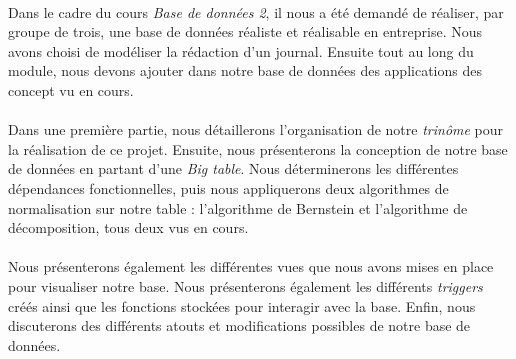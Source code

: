 \paragraph{}{
    Dans le cadre du cours \textit{Base de données 2}, il nous a été demandé de réaliser, par groupe de trois, une base de données réaliste et réalisable en entreprise. Nous avons choisi de modéliser la rédaction d'un journal. Ensuite tout au long du module, nous devons ajouter dans notre base de données des applications des concept vu en cours.
}

\paragraph{}{
    Dans une première partie, nous détaillerons l'organisation de notre \textit{trinôme} pour la réalisation de ce projet. Ensuite, nous présenterons la conception de notre base de données en partant d'une \textit{Big table}. Nous déterminerons les différentes dépendances fonctionnelles, puis nous appliquerons deux algorithmes de normalisation sur notre table : l'algorithme de Bernstein et l'algorithme de décomposition, tous deux vus en cours.
}

\paragraph{}{
    Nous présenterons également les différentes vues que nous avons mises en place pour visualiser notre base. Nous présenterons également les différents \textit{triggers} créés ainsi que les fonctions stockées pour interagir avec la base. \newline
    Enfin, nous discuterons des différents atouts et modifications possibles de notre base de données.
}